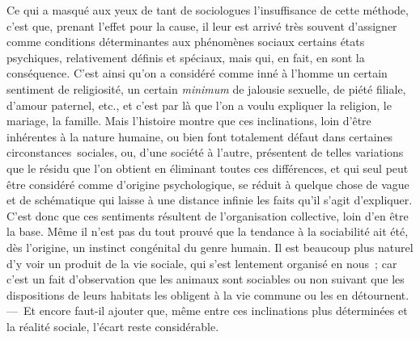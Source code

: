 \documentclass[french,twoside]{book} %
\begin{document}
Ce qui a masqué aux yeux de tant de sociologues l’insuffisance de cette méthode, c’est que, prenant l’effet pour la cause, il leur est arrivé très souvent d’assigner comme conditions déterminantes aux phénomènes sociaux certains états psychiques, relativement définis et spéciaux, mais qui, en fait, en sont la conséquence. C’est ainsi qu’on a considéré comme inné à l’homme un certain sentiment de religiosité, un certain {\itshape minimum} de jalousie sexuelle, de piété filiale, d’amour paternel, etc., et c’est par là que l’on a voulu expliquer la religion, le mariage, la famille. Mais l’histoire montre que ces inclinations, loin d’être inhérentes à la nature humaine, ou bien font totalement défaut dans certaines circonstances sociales, ou, d’une société à l’autre, présentent de telles variations que le résidu que l’on obtient en éliminant toutes ces différences, et qui seul peut être considéré comme d’origine psychologique, se réduit à quelque chose de vague et de schématique qui laisse à une distance infinie les faits qu’il s’agit d’expliquer. C’est donc que ces sentiments résultent de l’organisation collective, loin d’en être la base. Même il n’est pas du tout prouvé que la tendance à la sociabilité ait été, dès l’origine, un instinct congénital du genre humain. Il est beaucoup plus naturel d’y voir un produit de la vie sociale, qui s’est lentement organisé en nous ; car c’est un fait d’observation que les animaux sont sociables ou non suivant que les dispositions de leurs habitats les obligent à la vie commune ou les en détournent. — Et encore faut-il ajouter que, même entre ces inclinations plus déterminées et la réalité sociale, l’écart reste considérable.\par
\end{document}
